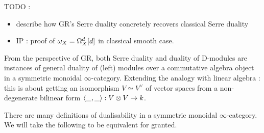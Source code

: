 \documentclass[./main.tex]{subfiles}
\begin{document}
TODO : 
\begin{itemize}
  \item describe how GR's Serre duality concretely
  recovers classical Serre duality
  \item IP : proof of $\omega_X = \Omega^d_X[d]$ in classical smooth case.
\end{itemize}

From the perspective of GR, 
both Serre duality and duality of D-modules are instances of
general duality of (left) modules over a commutative algebra object in
a symmetric monoidal $\infty$-category.
Extending the analogy with linear algebra : 
this is about getting an isomorphism $V \simeq V^\vee$ of vector spaces
from a non-degenerate bilinear form $\langle\_,\_\rangle : V \otimes V \to k$.

There are many definitions of dualisability in a 
symmetric monoidal $\infty$-category.
We will take the following to be equivalent for granted.
\end{document}
